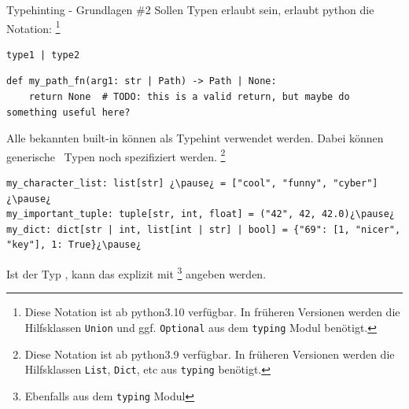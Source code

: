 \documentclass[12pt, aspectratio=169, usepdftitle=false]{beamer}
\newcommand{\pp}[1]{\lpl{#1}}
\begin{document}
\begin{frame}[fragile]{Typehinting - Grundlagen \#2}	
        Sollen  Typen erlaubt sein, erlaubt python die Notation:
		\footnote{Diese Notation ist ab python3.10 verfügbar.  In früheren Versionen werden die Hilfsklassen \texttt{Union} und ggf. \texttt{Optional} aus dem \texttt{typing} Modul benötigt.}
		
		\begin{lstlisting}[language=pytiny]
type1 | type2
		\end{lstlisting}%
		
		\medskip
		
		\begin{lstlisting}[language=pytiny]
def my_path_fn(arg1: str | Path) -> Path | None:
    return None  # TODO: this is a valid return, but maybe do something useful here?
		\end{lstlisting}
		
		\medskip
		
		Alle bekannten built-in  können als Typehint verwendet werden.\newline
		Dabei können \glqq generische\grqq~ Typen noch  spezifiziert werden.
		\footnote{Diese Notation ist ab python3.9 verfügbar. In früheren Versionen werden die Hilfsklassen \texttt{List}, \texttt{Dict}, etc aus \texttt{typing} benötigt.}
		
		\begin{lstlisting}[language=pytiny]
my_character_list: list[str] ¿\pause¿ = ["cool", "funny", "cyber"]¿\pause¿
my_important_tuple: tuple[str, int, float] = ("42", 42, 42.0)¿\pause¿
my_dict: dict[str | int, list[int | str] | bool] = {"69": [1, "nicer", "key"], 1: True}¿\pause¿
		\end{lstlisting}%
		
		Ist der Typ , kann das explizit mit \pp{Any}%
		\footnote{Ebenfalls aus dem \texttt{typing} Modul} angeben werden.

	
\end{frame}
\end{document}

